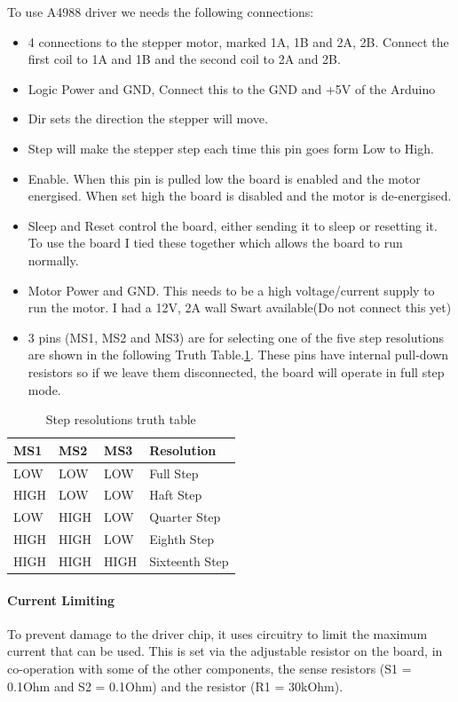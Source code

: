 To use A4988 driver we needs the following connections: 
\begin{itemize}
\item 4 connections to the stepper motor, marked 1A, 1B and 2A, 2B. Connect the first coil to 1A and 1B and the second coil to 2A and 2B.
\item Logic Power and GND, Connect this to the GND and +5V of the Arduino
\item Dir sets the direction the stepper will move.
\item Step will make the stepper step each time this pin goes form Low to High.
\item Enable. When this pin is pulled low the board is enabled and the motor energised. When set high the board is disabled and the motor is de-energised.
\item Sleep and Reset control the board, either sending it to sleep or resetting it. To use the board I tied these together which allows the board to run normally.
\item Motor Power and GND. This needs to be a high voltage/current supply to run the motor. I had a 12V, 2A wall Swart available(Do not connect this yet)
\item 3 pins (MS1, MS2 and MS3) are for selecting one of the five step resolutions are shown in the following Truth Table.\ref{tab:step_resolutions_truth_table}. These pins have internal pull-down resistors so if we leave them disconnected, the board will operate in full step mode.
\end{itemize}
\begin{table}[H]
\centering
\caption{Step resolutions truth table}
\label{tab:step_resolutions_truth_table}
\begin{tabular}{@{}llll@{}}
\toprule
\textbf{MS1} & \textbf{MS2} & \textbf{MS3} & \textbf{Resolution} \\ \midrule
LOW          & LOW          & LOW          & Full Step           \\
HIGH         & LOW          & LOW          & Haft Step           \\
LOW          & HIGH         & LOW          & Quarter Step        \\
HIGH         & HIGH         & LOW          & Eighth Step         \\
HIGH         & HIGH         & HIGH         & Sixteenth Step      \\ \bottomrule
\end{tabular}
\end{table}
\paragraph{Current Limiting}
To prevent damage to the driver chip, it uses circuitry to limit the maximum current that can be used. This is set via the adjustable resistor on the board, in co-operation with some of the other components, the sense resistors (S1 = 0.1Ohm and S2 = 0.1Ohm) and the resistor (R1 = 30kOhm).


